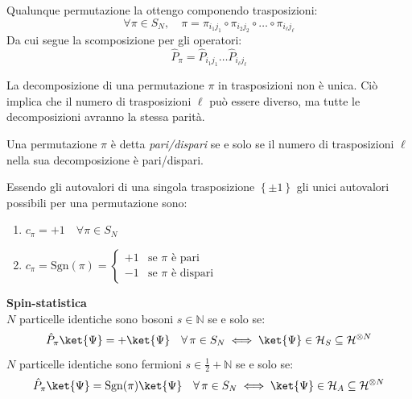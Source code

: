 Qualunque permutazione la ottengo componendo trasposizioni:
\[
\forall \pi \in S_N, \quad \pi = \pi_{i_1 j_1} \circ \pi_{i_2 j_2} \circ \dots \circ \pi_{i_\ell j_\ell}
\]
Da cui segue la scomposizione per gli operatori:
\[
\hat{P}_{\pi} = \hat{P}_{i_1 j_1} \dots \hat{P}_{i_\ell j_\ell}
\]

\begin{remark}
    La decomposizione di una permutazione \( \pi \) in trasposizioni non è unica.
    Ciò implica che il numero di trasposizioni \( \ell \) può essere diverso, ma tutte le decomposizioni avranno la stessa parità.
\end{remark}

\begin{definition}
    Una permutazione \( \pi \) è detta \textit{pari/dispari} se e solo se il numero di trasposizioni \( \ell \) nella sua decomposizione è pari/dispari.
\end{definition}

Essendo gli autovalori di una singola trasposizione \(\left\{ \pm 1 \right\}\) gli unici autovalori possibili per una permutazione sono:

\begin{enumerate}
    \item \( c_{\pi} = +1 \quad \forall \pi \in S_N \)
    \item \( c_{\pi} = \mathrm{Sgn}(\pi) = 
    \begin{cases}
        +1 & \text{se } \pi \text{ è pari} \\
        -1 & \text{se } \pi \text{ è dispari}
    \end{cases}
    \)
\end{enumerate}


\begin{theorem}
    { \normalfont \textbf{Spin-statistica}}\\
    \(N\) particelle identiche sono bosoni \(s \in \mathbb{N}\) se e solo se:
    \begin{equation}
        \hat{P}_{\pi}\ket{\Psi}= +\ket{\Psi} \quad  \forall\,\pi \in S_N \iff \ket{\Psi}\in \mathcal{H}_S \subseteq \mathcal{H}^{\otimes N}
    \end{equation}
    \(N\) particelle identiche sono fermioni \(s \in \frac12 + \mathbb{N}\) se e solo se:
    \begin{equation}
        \hat{P}_{\pi}\ket{\Psi}= \mathrm{Sgn}(\pi)\ket{\Psi} \quad  \forall\,\pi \in S_N \iff \ket{\Psi}\in \mathcal{H}_A \subseteq \mathcal{H}^{\otimes N}
    \end{equation}
\end{theorem}


